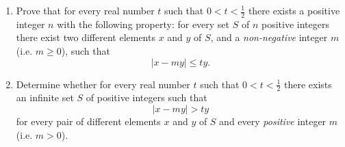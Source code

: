 \begin{enumerate}[label=(\alph*)]

	\item Prove that for every real number $t$ such that $0<t<\frac{1}{2}$ there exists a positive integer $n$ with the following property: for every set $S$ of $n$ positive integers there exist two different elements $x$ and $y$ of $S$, and a \emph{non-negative} integer $m$ (i.e. $m\geq0$), such that \[\left|x-my\right|\leq ty.\]
	
	\item Determine whether for every real number $t$ such that $0<t<\frac{1}{2}$ there exists an infinite set $S$ of positive integers such that \[\left|x-my\right|>ty\] for every pair of different elements $x$ and $y$ of $S$ and every \emph{positive} integer $m$ (i.e. $m>0$).
	
\end{enumerate}